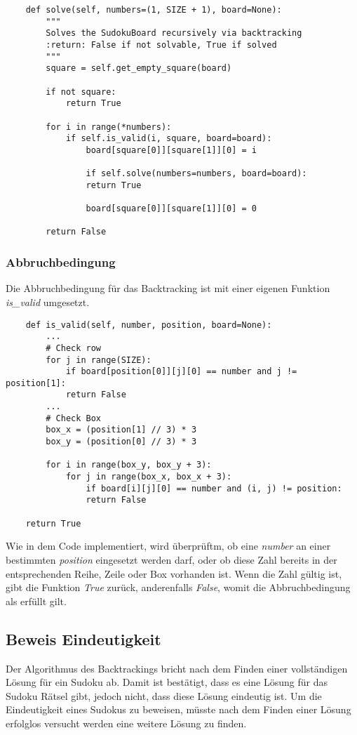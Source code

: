 \begin{lstlisting}
	def solve(self, numbers=(1, SIZE + 1), board=None):
		"""
		Solves the SudokuBoard recursively via backtracking
		:return: False if not solvable, True if solved
		"""
		square = self.get_empty_square(board)
		
		if not square:
			return True
		
		for i in range(*numbers):
			if self.is_valid(i, square, board=board):
				board[square[0]][square[1]][0] = i
		
				if self.solve(numbers=numbers, board=board):
				return True
		
				board[square[0]][square[1]][0] = 0
		
		return False
\end{lstlisting}

\subsubsection{Abbruchbedingung}
Die Abbruchbedingung für das Backtracking ist mit einer eigenen Funktion \textit{is\_valid} umgesetzt.
\begin{lstlisting}
	def is_valid(self, number, position, board=None):
		...
		# Check row
		for j in range(SIZE):
			if board[position[0]][j][0] == number and j != position[1]:
			return False
		...
		# Check Box
		box_x = (position[1] // 3) * 3
		box_y = (position[0] // 3) * 3
		
		for i in range(box_y, box_y + 3):
			for j in range(box_x, box_x + 3):
				if board[i][j][0] == number and (i, j) != position:
				return False
		
	return True
\end{lstlisting}
Wie in dem Code implementiert, wird überprüftm, ob eine \textit{number} an einer bestimmten \textit{position} eingesetzt werden darf, oder ob diese Zahl bereits in der entsprechenden Reihe, Zeile oder Box vorhanden ist. Wenn die Zahl gültig ist, gibt die Funktion \textit{True} zurück, anderenfalls \textit{False}, womit die Abbruchbedingung als erfüllt gilt. \cite{knott_2017} 

\subsection{Beweis Eindeutigkeit}
Der Algorithmus des Backtrackings bricht nach dem Finden einer vollständigen Lösung für ein Sudoku ab. Damit ist bestätigt, dass es eine Lösung für das Sudoku Rätsel gibt, jedoch nicht, dass diese Lösung eindeutig ist. Um die Eindeutigkeit eines Sudokus zu beweisen, müsste nach dem Finden einer Lösung erfolglos versucht werden eine weitere Lösung zu finden.

